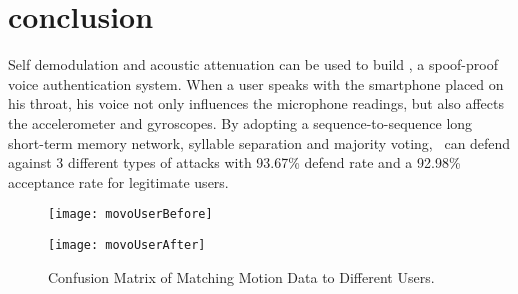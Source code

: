 \section{conclusion}

Self demodulation and acoustic attenuation can be used to build {\shortname}, a spoof-proof voice authentication system. When a user speaks with the smartphone placed on his throat, his voice not only influences the microphone readings, but also affects the accelerometer and gyroscopes. By adopting a sequence-to-sequence long short-term memory network, syllable separation and majority voting, \shortname~can defend against 3 different types of attacks with 93.67\% defend rate and a 92.98\% acceptance rate for legitimate users.




\begin{landscape}
	\begin{figure}[h]
		\centering
		\begin{minipage}{.48\linewidth}
			\texttt{[image: movoUserBefore]}
			\label{fig:usermata}
			\vspace{.05in}
		\end{minipage}
		\begin{minipage}{.48\linewidth}
			\texttt{[image: movoUserAfter]}
			\label{fig:usermatb}
			\vspace{.05in}
		\end{minipage}
		\caption{Confusion Matrix of Matching Motion Data to Different Users.}
		\label{fig:usermat}
	\end{figure}
\end{landscape}